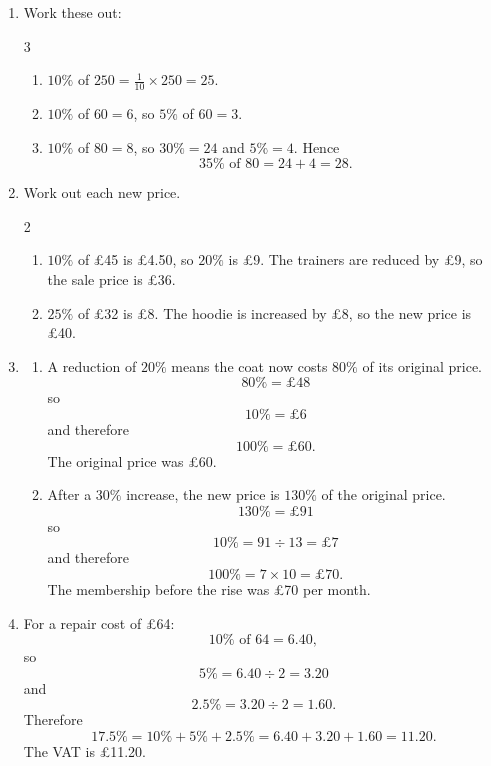 \documentclass[11pt,a4paper]{article}
\begin{document}
\begin{enumerate}
\item Work these out:
\begin{multicols}{3}
\begin{enumerate}
  \item \(10\%\) of \(250=\frac{1}{10}\times 250=25\).
  \item \(10\%\) of \(60=6\), so \(5\%\) of \(60=3\).
  \item \(10\%\) of \(80=8\), so \(30\%=24\) and \(5\%=4\). Hence
  \[
  35\%\text{ of }80=24+4=28.
  \]
\end{enumerate}
\end{multicols}

\item Work out each new price.
\begin{multicols}{2}
\begin{enumerate}
  \item \(10\%\) of \pounds45 is \pounds4.50, so \(20\%\) is \pounds9.
  The trainers are reduced by \pounds9, so the sale price is \pounds36.

  \item \(25\%\) of \pounds32 is \pounds8.
  The hoodie is increased by \pounds8, so the new price is \pounds40.
\end{enumerate}
\end{multicols}

\item
\begin{enumerate}
  \item A reduction of \(20\%\) means the coat now costs \(80\%\) of its original price.
  \[
  80\%=\pounds48
  \]
  so
  \[
  10\%=\pounds6
  \]
  and therefore
  \[
  100\%=\pounds60.
  \]
  The original price was \pounds60.

  \item After a \(30\%\) increase, the new price is \(130\%\) of the original price.
  \[
  130\%=\pounds91
  \]
  so
  \[
  10\%=91\div 13=\pounds7
  \]
  and therefore
  \[
  100\%=7\times 10=\pounds70.
  \]
  The membership before the rise was \pounds70 per month.
\end{enumerate}

\item For a repair cost of \pounds64:
\[
10\%\text{ of }64=6.40,
\]
so
\[
5\%=6.40\div 2=3.20
\]
and
\[
2.5\%=3.20\div 2=1.60.
\]
Therefore
\[
17.5\%=10\%+5\%+2.5\%=6.40+3.20+1.60=11.20.
\]
The VAT is \pounds11.20.


\end{enumerate}
\end{document}

